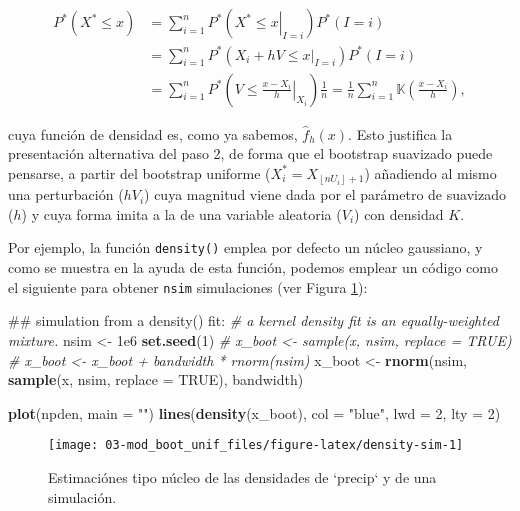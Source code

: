 \documentclass[]{book}
\newenvironment{Shaded}{\begin{snugshade}}{\end{snugshade}}
\newcommand{\KeywordTok}[1]{\textcolor[rgb]{0.13,0.29,0.53}{\textbf{#1}}}
\newcommand{\DataTypeTok}[1]{\textcolor[rgb]{0.13,0.29,0.53}{#1}}
\newcommand{\DecValTok}[1]{\textcolor[rgb]{0.00,0.00,0.81}{#1}}
\newcommand{\FloatTok}[1]{\textcolor[rgb]{0.00,0.00,0.81}{#1}}
\newcommand{\StringTok}[1]{\textcolor[rgb]{0.31,0.60,0.02}{#1}}
\newcommand{\CommentTok}[1]{\textcolor[rgb]{0.56,0.35,0.01}{\textit{#1}}}
\newcommand{\OtherTok}[1]{\textcolor[rgb]{0.56,0.35,0.01}{#1}}
\newcommand{\NormalTok}[1]{#1}
\theoremstyle{break}
\theoremstyle{definition}
\theoremstyle{definition}
\theoremstyle{definition}
\theoremstyle{remark}
\begin{document}
\[\begin{aligned}
P^{\ast}\left( X^{\ast}\leq x \right) &= \sum_{i=1}^{n}P^{\ast}\left(
\left. X^{\ast}\leq x\right\vert _{I=i} \right) P^{\ast}\left( I=i \right) \\
&= \sum_{i=1}^{n}P^{\ast}\left( \left. X_i+hV\leq x\right\vert
_{I=i} \right) P^{\ast}\left( I=i \right) \\
&= \sum_{i=1}^{n}P^{\ast}\left( \left. V\leq \frac{x-X_i}{h}
\right\vert _{X_i} \right) \frac{1}{n}=\frac{1}{n}\sum_{i=1}^{n}\mathbb{K}
\left( \frac{x-X_i}{h} \right),
\end{aligned}\]

cuya función de densidad es, como ya sabemos,
\(\hat{f}_{h}\left( x \right)\). Esto justifica la presentación
alternativa del paso 2, de forma que el bootstrap suavizado puede
pensarse, a partir del bootstrap uniforme
(\(X_i^{\ast}=X_{\left\lfloor nU_i\right\rfloor +1}\)) añadiendo al
mismo una perturbación (\(hV_i\)) cuya magnitud viene dada por el
parámetro de suavizado (\(h\)) y cuya forma imita a la de una variable
aleatoria (\(V_i\)) con densidad \(K\).

Por ejemplo, la función \texttt{density()} emplea por defecto un núcleo
gaussiano, y como se muestra en la ayuda de esta función, podemos
emplear un código como el siguiente para obtener \texttt{nsim}
simulaciones (ver Figura \ref{fig:density-sim}):

\begin{Shaded}
\begin{Highlighting}[]
\NormalTok{## simulation from a density() fit:}
\CommentTok{# a kernel density fit is an equally-weighted mixture.}
\NormalTok{nsim <-}\StringTok{ }\FloatTok{1e6}
\KeywordTok{set.seed}\NormalTok{(}\DecValTok{1}\NormalTok{)}
\CommentTok{# x_boot <- sample(x, nsim, replace = TRUE)}
\CommentTok{# x_boot <- x_boot + bandwidth * rnorm(nsim)}
\NormalTok{x_boot <-}\StringTok{ }\KeywordTok{rnorm}\NormalTok{(nsim, }\KeywordTok{sample}\NormalTok{(x, nsim, }\DataTypeTok{replace =} \OtherTok{TRUE}\NormalTok{), bandwidth)}

\KeywordTok{plot}\NormalTok{(npden, }\DataTypeTok{main =} \StringTok{""}\NormalTok{)}
\KeywordTok{lines}\NormalTok{(}\KeywordTok{density}\NormalTok{(x_boot), }\DataTypeTok{col =} \StringTok{"blue"}\NormalTok{, }\DataTypeTok{lwd =} \DecValTok{2}\NormalTok{, }\DataTypeTok{lty =} \DecValTok{2}\NormalTok{)}
\end{Highlighting}
\end{Shaded}

\begin{figure}[!htb]

{\centering \texttt{[image: 03-mod\_boot\_unif\_files/figure-latex/density-sim-1]} 

}

\caption{Estimaciónes tipo núcleo de las densidades de `precip` y de una simulación.}\label{fig:density-sim}
\end{figure}
\end{document}
